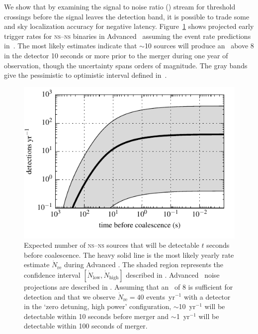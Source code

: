 We show that by examining the signal to noise ratio (\SNR{}) stream for
threshold crossings before the \GW{} signal leaves the detection band, it is
possible to trade some \SNR{} and sky localization
accuracy for negative latency.  Figure~\ref{fig:earlywarning} shows
projected early trigger rates for \textsc{ns}--\textsc{ns} binaries in Advanced
\LIGO\ assuming the event rate predictions in~\cite{Abadie:2010p10836}.  The
most likely estimates indicate that $\sim$10 sources will produce an \SNR\
above 8 in the detector 10 seconds or more prior to the merger during one
year of observation, though the uncertainty spans orders of magnitude.
The gray bands give the pessimistic to optimistic interval defined
in~\cite{Abadie:2010p10836}.
%
\begin{figure}
\begin{center}
\includegraphics{figures/snr_in_time.pdf}
\caption{\label{fig:earlywarning} Expected number of \textsc{ns}--\textsc{ns}
sources that will be detectable $t$ seconds before coalescence.  The heavy
solid line is the most likely yearly rate estimate $\dot N_{\mathrm{re}}$
during Advanced \LIGO.  The shaded region represents the confidence interval
$[\dot N_{\mathrm{low}}, \dot N_{\mathrm{high}}]$ described in
\cite{Abadie:2010p10836}.  Advanced \LIGO\ noise projections are described in
\cite{ALIGONoise}.  Assuming that an \SNR\ of 8 is sufficient for detection and
that we observe $\dot N_{\mathrm{re}} = 40$ events~yr$^{-1}$ with a detector in
the `zero detuning, high power' configuration, $\sim$10~yr$^{-1}$ will be
detectable within 10 seconds before merger and $\sim$1~yr$^{-1}$ will be
detectable within 100 seconds of merger.} 
\end{center}
\end{figure}

